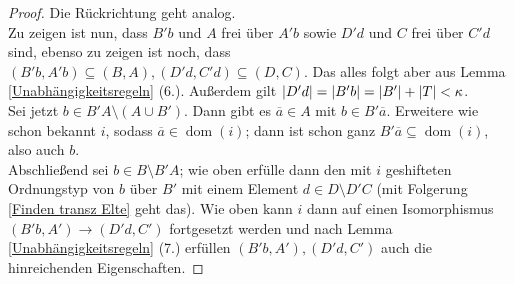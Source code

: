 \begin{proof}
	Die Rückrichtung geht analog.\\
	Zu zeigen ist nun, dass $B'b$ und $A$ frei über $A'b$ sowie $D'd$ und $C$ frei über $C'd$ sind, ebenso zu zeigen ist noch, dass $(B'b,A'b)\subseteq(B,A),(D'd,C'd)\subseteq(D,C)$. Das alles folgt aber aus Lemma \ref{Unabhängigkeitsregeln} (6.). Außerdem gilt ${\left| D'd \right|}={\left| B'b \right|}={\left| B' \right|}+{\left| T \right|}<\kappa$.\\
	Sei jetzt $b\in B'A\setminus(A\cup B')$. Dann gibt es $\overline{a}\in A$ mit $b\in B'\overline{a}$. Erweitere wie schon bekannt $i$, sodass $\overline{a}\in\operatorname{dom}(i)$; dann ist schon ganz $B'\overline{a}\subseteq\operatorname{dom}(i)$, also auch $b$.\\
	Abschließend sei $b\in B\setminus B'A$;  wie oben erfülle dann den mit $i$ geshifteten Ordnungstyp von $b$ über $B'$ mit einem Element $d\in D\setminus D'C$ (mit Folgerung \ref{Finden transz Elte} geht das). Wie oben kann $i$ dann auf einen Isomorphismus $(B'b,A')\rightarrow(D'd,C')$ fortgesetzt werden und nach Lemma \ref{Unabhängigkeitsregeln} (7.) erfüllen $(B'b,A'),(D'd,C')$ auch die hinreichenden Eigenschaften.
\end{proof}

